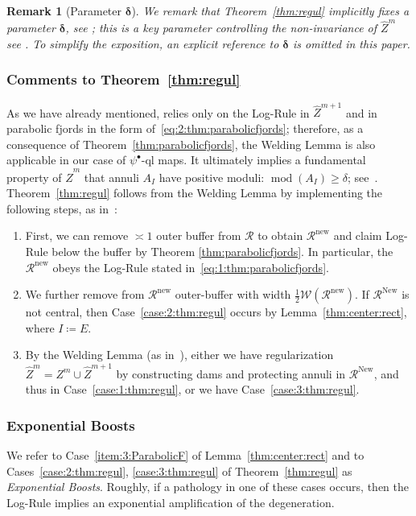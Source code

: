 \documentclass{amsart}
\newcommand{\1}{{\mathbb 1 }}
\newcommand{\Width}{{\mathcal W}}
\newcommand\RR{\mathcal{R}}
\newcommand{\wZ}{{\widehat Z}}
\newcommand\new{{\operatorname{new}}}
\newcommand\New{{\operatorname{New}}}
\newtheorem{rem}[thm]{Remark}
\theoremstyle{remark}
\numberwithin{equation}{section}
\theoremstyle{definition}
\renewcommand{\mod}{\operatorname{mod}}
\newcommand{\bdelta}{{\boldsymbol{ \delta}}}
\begin{document}
\begin{rem}[Parameter $\bdelta$] We remark that Theorem~\ref{thm:regul} implicitly fixes a parameter $\bdelta$, see \cite[Remark~7.5]{DL22}; this is a key parameter controlling the non-invariance of $\wZ^m$ see \cite[Assumption 2 in~\S5.1]{DL22}. 
To simplify the exposition, an explicit reference to $\bdelta$ is omitted in this paper. 
\end{rem}


\subsubsection{Comments to Theorem~\ref{thm:regul}} \label{sss:comments:thm:regul}

As we have already mentioned, \cite[Welding Lemma~7.1]{DL22} relies only on the Log-Rule in $\wZ^{m+1}$ and in parabolic fjords in the form of~\eqref{eq:2:thm:parabolicfjords}; therefore, as a consequence of Theorem~\ref{thm:parabolicfjords}, the Welding Lemma is also applicable in our case of $\psi^\bullet$-ql maps. It ultimately implies a fundamental property of $\wZ^m$ that annuli $A_I$ have positive moduli: $\mod(A_I)\ge \delta$; see~\cite[Assumption 2 in \S5]{DL22}. Theorem~\ref{thm:regul} follows from the Welding Lemma by implementing the following steps, as in~\cite[\S7.2]{DL22}: 
\begin{enumerate}
    \item First, we can remove $\asymp 1$ outer buffer from $\RR$ to obtain $\RR^\new$ and claim Log-Rule below the buffer by Theorem \ref{thm:parabolicfjords}. In particular, the $\RR^\new$ obeys the Log-Rule stated in~\eqref{eq:1:thm:parabolicfjords}.
    \item We further remove from $\RR^\new$ outer-buffer with width $\frac 12 \Width(\RR^\new)$. If $\RR^\New$ is not central, then Case~\ref{case:2:thm:regul} occurs by Lemma~\ref{thm:center:rect}, where $I\coloneqq E$.
    \item By the Welding Lemma (as in~\cite[Lemma~7.1]{DL22}), either we have regularization $\wZ^m=Z^m\cup \wZ^{m+1}$ by constructing dams and protecting annuli in $\RR^\New$, and thus in Case~\ref{case:1:thm:regul}, or we have Case~\ref{case:3:thm:regul}.
\end{enumerate}


\subsubsection{Exponential Boosts}\label{sss:ExponBoost} 
We refer to Case~\ref{item:3:ParabolicF} of Lemma~\ref{thm:center:rect} and to Cases~\eqref{case:2:thm:regul}, \eqref{case:3:thm:regul}   of Theorem~\ref{thm:regul} as \emph{Exponential Boosts}. Roughly, if a pathology in one of these cases occurs, then the Log-Rule implies an exponential amplification of the degeneration. 
\end{document}
